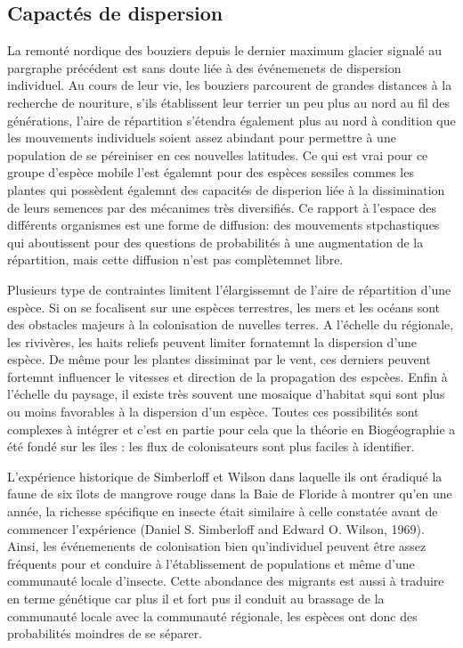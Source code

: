 \subsection*{Capactés de dispersion}\label{capactuxe9s-de-dispersion}

La remonté nordique des bouziers depuis le dernier maximum glacier
signalé au pargraphe précédent est sans doute liée à des événemenets de
dispersion individuel. Au cours de leur vie, les bouziers parcourent de
grandes distances à la recherche de nouriture, s'ils établissent leur
terrier un peu plus au nord au fil des générations, l'aire de
répartition s'étendra également plus au nord à condition que les
mouvements individuels soient assez abindant pour permettre à une
population de se péreiniser en ces nouvelles latitudes. Ce qui est vrai
pour ce groupe d'espèce mobile l'est égalemnt pour des espèces sessiles
commes les plantes qui possèdent égalemnt des capacités de disperion
liée à la dissimination de leurs semences par des mécanimes très
diversifiés. Ce rapport à l'espace des différents organismes est une
forme de diffusion: des mouvements stpchastiques qui aboutissent pour
des questions de probabilités à une augmentation de la répartition, mais
cette diffusion n'est pas complètemnet libre.

Plusieurs type de contraintes limitent l'élargissemnt de l'aire de
répartition d'une espèce. Si on se focalisent sur une espèces
terrestres, les mers et les océans sont des obstacles majeurs à la
colonisation de nuvelles terres. A l'échelle du régionale, les
rivivères, les haits reliefs peuvent limiter fornatemnt la dispersion
d'une espèce. De même pour les plantes dissiminat par le vent, ces
derniers peuvent fortemnt influencer le vitesses et direction de la
propagation des espcèes. Enfin à l'échelle du paysage, il existe très
souvent une mosaique d'habitat squi sont plus ou moins favorables à la
dispersion d'un espèce. Toutes ces possibilités sont complexes à
intégrer et c'est en partie pour cela que la théorie en Biogéographie a
été fondé sur les îles : les flux de colonisateurs sont plus faciles à
identifier.

L'expérience historique de Simberloff et Wilson dans laquelle ils ont
éradiqué la faune de six îlots de mangrove rouge dans la Baie de Floride
à montrer qu'en une année, la richesse spécifique en insecte était
similaire à celle constatée avant de commencer l'expérience (Daniel S.
Simberloff and Edward O. Wilson, 1969). Ainsi, les événemenents de
colonisation bien qu'individuel peuvent être assez fréquents pour et
conduire à l'établissement de populations et même d'une communauté
locale d'insecte. Cette abondance des migrants est aussi à traduire en
terme génétique car plus il et fort pus il conduit au brassage de la
communauté locale avec la communauté régionale, les espèces ont donc des
probabilités moindres de se séparer.

